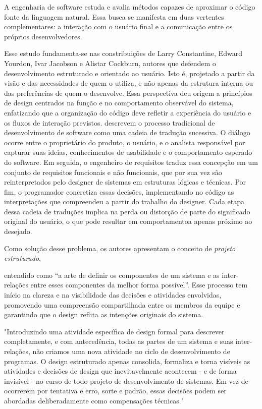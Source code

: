 \documentclass[12pt,a4paper]{article}
\begin{document}
A engenharia de software estuda e avalia métodos capazes de aproximar o código fonte da linguagem natural. Essa busca se manifesta em duas vertentes complementares: a interação com o usuário final e a comunicação entre os próprios desenvolvedores.

Esse estudo fundamenta-se nas constribuições de Larry Constantine, Edward Yourdon, Ivar Jacobson e Alistar Cockburn, autores que defendem o desenvolvimento estruturado e orientado ao usuário. Isto é, projetado a partir da visão e das necessidades de quem o utiliza, e não apenas da estrutura interna ou das preferências de quem o desenvolve. Essa perspectiva deu origem a princípios de design centrados na função e no comportamento observável do sistema, enfatizando que a organização do código deve refletir a experiência do usuário e os fluxos de interação previstos. \textcite{yourdon1979structured} descrevem o processo tradicional de desenvolvimento de software como uma cadeia de tradução sucessiva. O diálogo ocorre entre o proprietário do produto, o usuário, e o analista responsável por capturar suas ideias, conhecimentos de usabilidade e o comportamento esperado do software. Em seguida, o engenheiro de requisitos traduz essa concepção em um conjunto de requisitos funcionais e não funcionais, que por sua vez são reinterpretados pelo designer de sistemas em estruturas lógicas e técnicas. Por fim, o programador concretiza essas decisões, implementando no código as interpretações que compreendeu a partir do trabalho do designer. Cada etapa dessa cadeia de traduções implica na perda ou distorção de parte do significado original do usuário, o que pode resultar em comportamentoa apenas próximo ao desejado.

Como solução desse problema, os autores apresentam o conceito de \textit{projeto estruturado}, 

entendido como “a arte de definir os componentes de um sistema e as inter-relações entre esses componentes da melhor forma possível”\textcite{yourdon1979structured}. Esse processo tem início na clareza e na visibilidade das decisões e atividades envolvidas, promovendo uma compreensão compartilhada entre os membros da equipe e garantindo que o design reflita as intenções originais do sistema.

"Introduzindo uma atividade específica de design formal para descrever completamente, e com antecedência, todas as partes de um sistema e suas inter-relações, não criamos uma nova atividade no ciclo de desenvolvimento de programas. O design estruturado apenas consolida, formaliza e torna visíveis as atividades e decisões de design que inevitavelmente acontecem - e de forma invisível - no curso de todo projeto de desenvolvimento de sistemas. Em vez de ocorrerem por tentativa e erro, sorte e padrão, essas decisões podem ser abordadas deliberadamente como compensações técnicas."
\end{document}
